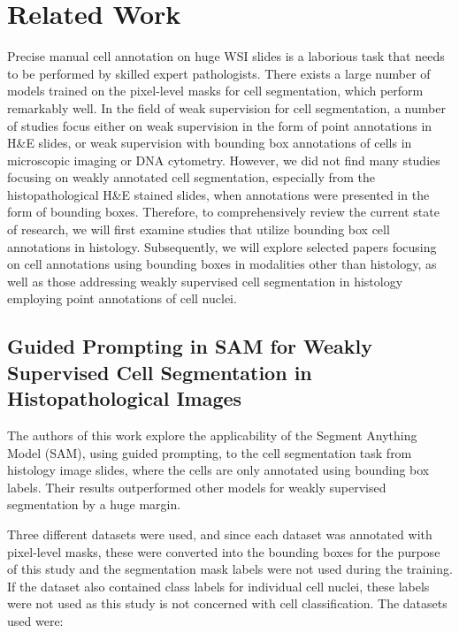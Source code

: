 \chapter{Related Work}
\label{chapter:related}

Precise manual cell annotation on huge WSI slides is a laborious task that needs to be performed by skilled expert pathologists. There exists a large number of models trained on the pixel-level masks for cell segmentation, which perform remarkably well. In the field of weak supervision for cell segmentation, a number of studies focus either on weak supervision in the form of point annotations in H\&E slides, or weak supervision with bounding box annotations of cells in microscopic imaging or DNA cytometry. However, we did not find many studies focusing on weakly annotated cell segmentation, especially from the histopathological H\&E stained slides, when annotations were presented in the form of bounding boxes. Therefore, to comprehensively review the current state of research, we will first examine studies that utilize bounding box cell annotations in histology. Subsequently, we will explore selected papers focusing on cell annotations using bounding boxes in modalities other than histology, as well as those addressing weakly supervised cell segmentation in histology employing point annotations of cell nuclei.


\section{Guided Prompting in SAM for Weakly Supervised Cell Segmentation in Histopathological Images \cite{Tyagi2023}}
\label{section:related-1}

The authors of this work explore the applicability of the Segment Anything Model (SAM), using guided prompting, to the cell segmentation task from histology image slides, where the cells are only annotated using bounding box labels. Their results outperformed other models for weakly supervised segmentation by a huge margin.

Three different datasets were used, and since each dataset was annotated with pixel-level masks, these were converted into the bounding boxes for the purpose of this study and the segmentation mask labels were not used during the training. If the dataset also contained class labels for individual cell nuclei, these labels were not used as this study is not concerned with cell classification. The datasets used were: 

